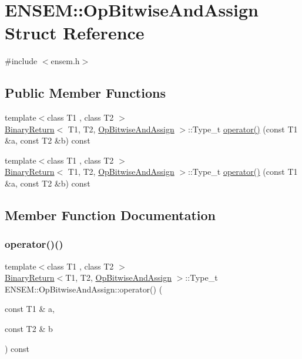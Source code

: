 \hypertarget{structENSEM_1_1OpBitwiseAndAssign}{}\section{E\+N\+S\+EM\+:\+:Op\+Bitwise\+And\+Assign Struct Reference}
\label{structENSEM_1_1OpBitwiseAndAssign}


{\ttfamily \#include $<$ensem.\+h$>$}

\subsection*{Public Member Functions}
\begin{DoxyCompactItemize}
\item 
{\footnotesize template$<$class T1 , class T2 $>$ }\\\mbox{\hyperlink{structENSEM_1_1BinaryReturn}{Binary\+Return}}$<$ T1, T2, \mbox{\hyperlink{structENSEM_1_1OpBitwiseAndAssign}{Op\+Bitwise\+And\+Assign}} $>$\+::Type\+\_\+t \mbox{\hyperlink{structENSEM_1_1OpBitwiseAndAssign_aeae291f2a2bdeac95b1d751d6d94b77d}{operator()}} (const T1 \&a, const T2 \&b) const
\item 
{\footnotesize template$<$class T1 , class T2 $>$ }\\\mbox{\hyperlink{structENSEM_1_1BinaryReturn}{Binary\+Return}}$<$ T1, T2, \mbox{\hyperlink{structENSEM_1_1OpBitwiseAndAssign}{Op\+Bitwise\+And\+Assign}} $>$\+::Type\+\_\+t \mbox{\hyperlink{structENSEM_1_1OpBitwiseAndAssign_aeae291f2a2bdeac95b1d751d6d94b77d}{operator()}} (const T1 \&a, const T2 \&b) const
\end{DoxyCompactItemize}


\subsection{Member Function Documentation}
\mbox{\label{structENSEM_1_1OpBitwiseAndAssign_aeae291f2a2bdeac95b1d751d6d94b77d}} 
\subsubsection{\texorpdfstring{operator()()}{operator()()}\hspace{0.1cm}{\footnotesize\ttfamily [1/2]}}
{\footnotesize\ttfamily template$<$class T1 , class T2 $>$ \\
\mbox{\hyperlink{structENSEM_1_1BinaryReturn}{Binary\+Return}}$<$T1, T2, \mbox{\hyperlink{structENSEM_1_1OpBitwiseAndAssign}{Op\+Bitwise\+And\+Assign}} $>$\+::Type\+\_\+t E\+N\+S\+E\+M\+::\+Op\+Bitwise\+And\+Assign\+::operator() (\begin{DoxyParamCaption}\item[{const T1 \&}]{a,  }\item[{const T2 \&}]{b }\end{DoxyParamCaption}) const\hspace{0.3cm}{\ttfamily [inline]}}

